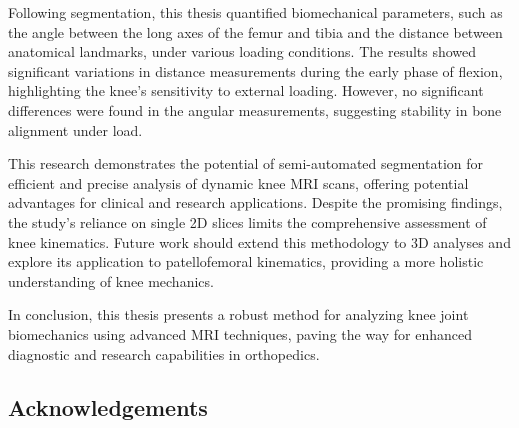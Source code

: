 \documentclass{micro-econ-thesis}
\begin{document}
Following segmentation, this thesis quantified biomechanical parameters, such as the angle between the long axes of the femur and tibia and the distance between anatomical landmarks, under various loading conditions. The results showed significant variations in distance measurements during the early phase of flexion, highlighting the knee's sensitivity to external loading. However, no significant differences were found in the angular measurements, suggesting stability in bone alignment under load.

This research demonstrates the potential of semi-automated segmentation for efficient and precise analysis of dynamic knee MRI scans, offering potential advantages for clinical and research applications. Despite the promising findings, the study's reliance on single 2D slices limits the comprehensive assessment of knee kinematics. Future work should extend this methodology to 3D analyses and explore its application to patellofemoral kinematics, providing a more holistic understanding of knee mechanics.

In conclusion, this thesis presents a robust method for analyzing knee joint biomechanics using advanced MRI techniques, paving the way for enhanced diagnostic and research capabilities in orthopedics.

\clearpage
\subsection*{Acknowledgements}


\cleardoublepage
\tableofcontents

\cleardoublepage
{}
{}
\listoffigures
\cleardoublepage
{}
{}
\listoftables

\cleardoublepage
{}
{}
\end{document}
